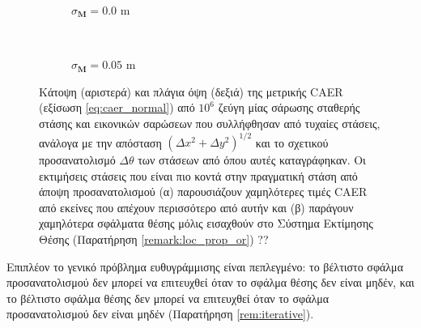 \begin{figure}[!h]
  \begin{subfigure}{\linewidth}\hspace{1cm}
    
    \vspace{0.25cm}
    \caption{\small $\sigma_{\bm{M}} = 0.0$ m}
    \vspace{0.5cm}
    \label{}
  \end{subfigure}\\%
  \begin{subfigure}{\linewidth}\hspace{1cm}
    
    \vspace{0.25cm}
    \caption{\small $\sigma_{\bm{M}} = 0.05$ m}
    \vspace{0.5cm}
    \label{}
  \end{subfigure}%
  \vspace{1cm}
  \caption{\small Κάτοψη (αριστερά) και πλάγια όψη (δεξιά) της μετρικής CAER
           (εξίσωση \ref{eq:caer_normal}) από $10^6$ ζεύγη μίας σάρωσης σταθερής
           στάσης και εικονικών σαρώσεων που συλλήφθησαν από τυχαίες στάσεις,
           ανάλογα με την απόσταση $(\Delta x^2 + \Delta y^2)^{1/2}$ και το
           σχετικού προσανατολισμό $\Delta \theta$ των στάσεων από όπου αυτές
           καταγράφηκαν. Οι εκτιμήσεις στάσεις που είναι πιο κοντά στην
           πραγματική στάση από άποψη προσανατολισμού (α) παρουσιάζουν
           χαμηλότερες τιμές CAER από εκείνες που απέχουν περισσότερο από αυτήν
           και (β) παράγουν χαμηλότερα σφάλματα θέσης μόλις εισαχθούν στο
           Σύστημα Εκτίμησης Θέσης (Παρατήρηση \ref{remark:loc_prop_or}) ??}
  \label{fig:02_04_04:caer}
\end{figure}




Επιπλέον το γενικό πρόβλημα ευθυγράμμισης
είναι πεπλεγμένο: το βέλτιστο σφάλμα προσανατολισμού δεν μπορεί να επιτευχθεί
όταν το σφάλμα θέσης δεν είναι μηδέν, και το βέλτιστο σφάλμα θέσης δεν μπορεί
να επιτευχθεί όταν το σφάλμα προσανατολισμού δεν είναι μηδέν (Παρατήρηση
\ref{rem:iterative}).


















